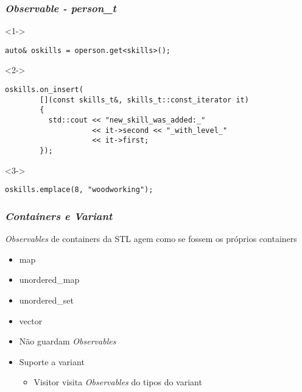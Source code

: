 \documentclass[t]{beamer}
\begin{document}
\begin{frame}[fragile]
  \frametitle{\textit{Observable - person\_t}}

  \begin{onlyenv}<1->
  \begin{lstlisting}[basicstyle=\small]
    auto& oskills = operson.get<skills>();
  \end{lstlisting}
  \end{onlyenv}

  \begin{onlyenv}<2->
  \begin{lstlisting}[basicstyle=\small]
    oskills.on_insert(
        [](const skills_t&, skills_t::const_iterator it)
        {
          std::cout << "new_skill_was_added:_"
                    << it->second << "_with_level_"
                    << it->first;
        });
  \end{lstlisting}
  \end{onlyenv}

  \begin{onlyenv}<3->
  \begin{lstlisting}[basicstyle=\small]
    oskills.emplace(8, "woodworking");
  \end{lstlisting}
  \end{onlyenv}
\end{frame}

\begin{frame}[fragile]
  \frametitle{\textit{Containers e Variant}}
  \textit{Observables} de containers da STL agem como se fossem os próprios containers
  \begin{itemize}
  \item{map}
  \item{unordered\_map}
  \item{unordered\_set}
  \item{vector}
  \item<2->{Não guardam \textit{Observables}}
  \end{itemize}

  \begin{itemize}
  \item<2->{Suporte a variant}
    \begin{itemize}
    \item{Visitor visita \textit{Observables} do tipos do variant}
    \end{itemize}
  \end{itemize}
\end{frame}
\end{document}
